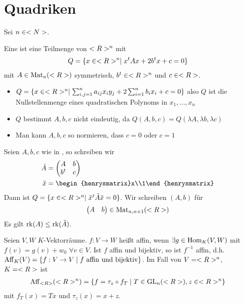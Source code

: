 \section{Quadriken}

Sei $n\in<N>$.

\begin{definition}[Quadrik]
	Eine  ist eine Teilmenge von $<R>^n$ mit
	\begin{align}
		Q=\{x\in<R>^n\mid x^tAx+2b^tx+c=0\}\notag
	\end{align}
	mit $A\in\operatorname{Mat}_n(<R>)$ symmetrisch, $b^t\in<R>^n$ und $c\in<R>$.
\end{definition}

\begin{remark}
	\begin{itemize}
		\item $Q=\{x\in<R>^n\mid \sum_{i,j=1}^n a_{ij}x_iy_j+2\sum_{i=1}^n b_ix_i+c=0\}$ also $Q$ ist die Nullstellenmenge eines quadratischen Polynoms in $x_1,...,x_n$
		\item $Q$ bestimmt $A,b,c$ nicht eindeutig, da $Q(A,b,c)=Q(\lambda A,\lambda b,\lambda c)$
		\item Man kann $A,b,c$ so normieren, dass $c=0$ oder $c=1$
	\end{itemize}
\end{remark}

\begin{remark}
	Seien $A,b,c$ wie in , so schreiben wir
	\begin{align}
		\tilde{A}&=\begin{pmatrix}A&b\\b^t&c\end{pmatrix}\notag \\
		\tilde{x}&=\begin{henrysmatrix}x\\1\end{henrysmatrix}\notag
	\end{align}
	Dann ist $Q=\{x\in<R>^n\mid \tilde{x}^t\tilde{A}\tilde{x}=0\}$. Wir schreiben $(A,b)$ für 
	\begin{align}
		\begin{pmatrix}A&b\end{pmatrix}\in\operatorname{Mat}_{n,n+1}(<R>)\notag
	\end{align}
	Es gilt $\operatorname{rk}(A)\le \operatorname{rk}(\tilde{A})$.
\end{remark}

\begin{remark}[Wiederholung]
	Seien $V,W$ $K$-Vektorräume. $f:V\to W$ heißt affin, wenn $\exists g\in\operatorname{Hom}_K(V,W)$ mit $f(v)=g(v)+w_0$ $\forall v\in V$. Ist $f$ affin und bijektiv, so ist $f^{-1}$ affin, d.h. $\operatorname{Aff}_K(V)=\{f:V\to V\mid f\text{ affin und bijektiv}\}$. Im Fall von $V=<R>^n$, $K=<R>$ ist
	\begin{align}
		\operatorname{Aff}_{<R>}(<R>^n)=\{f=\tau_z\circ f_T\mid T\in\operatorname{GL}_n(<R>),z\in<R>^n\}\notag
	\end{align}
	mit $f_T(x)=Tx$ und $\tau_z(x)=x+z$.
\end{remark}

